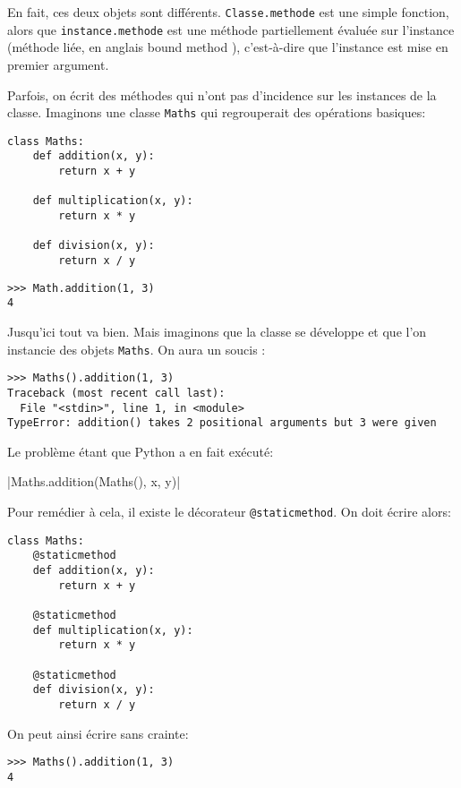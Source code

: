 En fait, ces deux objets sont différents. \texttt{Classe.methode} est une simple fonction, alors que \texttt{instance.methode} est une méthode partiellement évaluée sur l'instance (méthode liée, en anglais \og bound method \fg{}), c'est-à-dire que l'instance est mise en premier argument.\bigskip

Parfois, on écrit des méthodes qui n'ont pas d'incidence sur les instances de la classe. Imaginons une classe \texttt{Maths} qui regrouperait des opérations basiques:

\begin{verbatim}
class Maths:
    def addition(x, y):
        return x + y

    def multiplication(x, y):
        return x * y

    def division(x, y):
        return x / y
\end{verbatim}

\begin{verbatim}
>>> Math.addition(1, 3)
4
\end{verbatim}

Jusqu'ici tout va bien. Mais imaginons que la classe se développe et que l'on instancie des objets \texttt{Maths}. On aura un soucis :

\begin{verbatim}
>>> Maths().addition(1, 3)
Traceback (most recent call last):
  File "<stdin>", line 1, in <module>
TypeError: addition() takes 2 positional arguments but 3 were given
\end{verbatim}

Le problème étant que Python a en fait exécuté:

|Maths.addition(Maths(), x, y)|

Pour remédier à cela, il existe le décorateur \texttt{@staticmethod}. On doit écrire alors:

\begin{verbatim}
class Maths:
    @staticmethod
    def addition(x, y):
        return x + y

    @staticmethod
    def multiplication(x, y):
        return x * y

    @staticmethod
    def division(x, y):
        return x / y
\end{verbatim}

On peut ainsi écrire sans crainte:

\begin{verbatim}
>>> Maths().addition(1, 3)
4
\end{verbatim}

